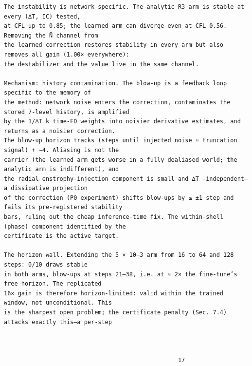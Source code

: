 \documentclass[letterpaper]{article}
\begin{document}
\begin{Verbatim}[fontsize=\fontsize{6.35}{7.15}\selectfont,breaklines=false]
The instability is network-specific. The analytic R3 arm is stable at every (∆T, IC) tested,
at CFL up to 0.85; the learned arm can diverge even at CFL 0.56. Removing the N̈ channel from
the learned correction restores stability in every arm but also removes all gain (1.00× everywhere):
the destabilizer and the value live in the same channel.

Mechanism: history contamination. The blow-up is a feedback loop specific to the memory of
the method: network noise enters the correction, contaminates the stored 7-level history, is amplified
by the 1/∆T k time-FD weights into noisier derivative estimates, and returns as a noisier correction.
The blow-up horizon tracks (steps until injected noise ≈ truncation signal) + ∼4. Aliasing is not the
carrier (the learned arm gets worse in a fully dealiased world; the analytic arm is indifferent), and
the radial enstrophy-injection component is small and ∆T -independent—a dissipative projection
of the correction (P0 experiment) shifts blow-ups by ≤ ±1 step and fails its pre-registered stability
bars, ruling out the cheap inference-time fix. The within-shell (phase) component identified by the
certificate is the active target.

The horizon wall. Extending the 5 × 10−3 arm from 16 to 64 and 128 steps: 0/10 draws stable
in both arms, blow-ups at steps 21–38, i.e. at ≈ 2× the fine-tune’s free horizon. The replicated
16× gain is therefore horizon-limited: valid within the trained window, not unconditional. This
is the sharpest open problem; the certificate penalty (Sec. 7.4) attacks exactly this—a per-step



                                                  17
\end{Verbatim}
\newpage
\end{document}
